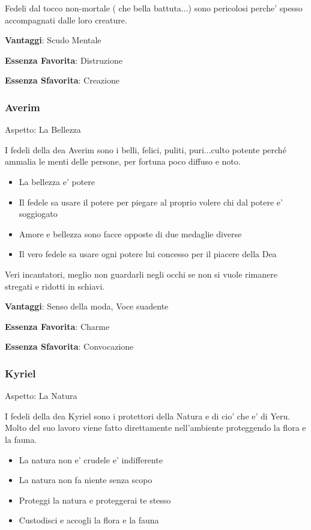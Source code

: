 \documentclass[a4paper,11pt,twoside,openany]{book}
\begin{document}
Fedeli dal tocco non-mortale ( che bella battuta...) sono pericolosi perche' spesso accompagnati dalle loro creature. 


\textbf{Vantaggi}: Scudo Mentale

\textbf{Essenza Favorita}: Distruzione

\textbf{Essenza Sfavorita}: Creazione
\bigskip

\subsubsection{Averim}

Aspetto: La Bellezza
\bigskip


I fedeli della dea Averim sono i belli, felici, puliti, puri...culto potente perché ammalia le menti delle persone, per fortuna poco diffuso e noto.

\begin{itemize}
	\item La bellezza e' potere
	\item Il fedele sa usare il potere per piegare al proprio volere chi dal potere e' soggiogato
	\item Amore e bellezza sono facce opposte di due medaglie diverse
	\item Il vero fedele sa usare ogni potere lui concesso per il piacere della Dea
\end{itemize}

Veri incantatori, meglio non guardarli negli occhi se non si vuole rimanere stregati e ridotti in schiavi.


\textbf{Vantaggi}: Senso della moda, Voce suadente

\textbf{Essenza Favorita}: Charme

\textbf{Essenza Sfavorita}: Convocazione

\bigskip

\subsubsection{Kyriel} 

Aspetto: La Natura
\bigskip

I fedeli della dea Kyriel sono i protettori della Natura e di cio' che e' di Yeru. Molto del suo lavoro viene fatto direttamente nell'ambiente proteggendo la flora e la fauna.

\begin{itemize}
	\item La natura non e' crudele e' indifferente
	\item La natura non fa niente senza scopo
	\item Proteggi la natura e proteggerai te stesso
	\item Custodisci e accogli la flora e la fauna
\end{itemize}
\end{document}
